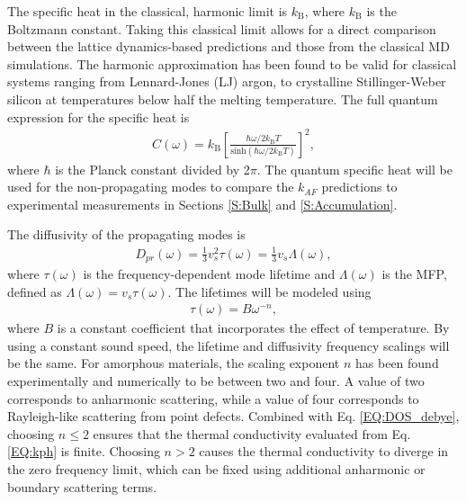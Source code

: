 \documentclass[aps,prb,twocolumn,superscriptaddress,footinbib,amsmath,amssymb,floatfix]{revtex4}
\begin{document}
The specific heat in the classical, harmonic limit is 
$k_{\text{B}}$, where $k_{\text{B}}$ is the Boltzmann constant. 
Taking this classical limit allows for a direct 
comparison between the lattice dynamics-based 
predictions and those from the classical MD simulations. 
The harmonic approximation has been found to be valid 
for classical systems ranging from 
Lennard-Jones (LJ) argon,\cite{mcgaughey_quantitative_2004} 
to crystalline Stillinger-Weber silicon\cite{larkin_comparison_2012} 
at temperatures below half the melting temperature. 
The full quantum expression for the specific heat is
\cite{ziman_electrons_2001}
\begin{equation}\label{EQ:Cquantum}
\begin{split}
C(\omega) = k_{\text{B}}\left[\frac{\hbar\omega/2k_{\text{B}}T}
{\text{sinh}(\hbar\omega/2k_{\text{B}}T)}\right]^2,
\end{split}
\end{equation} 
where $\hbar$ is the Planck constant divided by 2$\pi$. 
The quantum specific heat will be used 
for the non-propagating modes to compare the $k_{AF}$ predictions 
to experimental measurements in Sections \ref{S:Bulk} 
and \ref{S:Accumulation}. 

The diffusivity of the propagating modes is    
\begin{equation}\label{EQ:Dtau}
\begin{split}
D_{pr}(\omega) = \frac{1}{3}v^2_s\tau(\omega) = \frac{1}{3}v_s \Lambda(\omega),
\end{split}
\end{equation}
where $\tau(\omega)$ is the frequency-dependent mode 
lifetime and $\Lambda(\omega)$ is the MFP, 
defined as $\Lambda(\omega) = v_{s} \tau(\omega)$. 
The lifetimes will be modeled using 
\begin{equation}\label{EQ:tauw2}
\begin{split}
\tau(\omega) = B \omega^{-n},
\end{split}
\end{equation}
where $B$ is a constant coefficient that incorporates 
the effect of temperature. 
By using a constant sound speed, the lifetime and diffusivity 
frequency scalings will be the same. 
For amorphous materials, the scaling exponent $n$ 
has been found experimentally and numerically to be 
between two and four.
\cite{feldman_numerical_1999,horbach_high_2001,
feldman_calculations_2002,masciovecchio_evidence_2006,
christie_vibrational_2007,liu_high_2009,
baldi_sound_2010,yang_anomalously_2010,baldi_elastic_2011,
he_heat_2011,baldi_emergence_2013}
A value of two corresponds to 
anharmonic scattering,\cite{callaway_model_1959} while a value of four 
corresponds to Rayleigh-like scattering from point defects.
\cite{klemens_scattering_1955}
Combined with Eq. \eqref{EQ:DOS_debye}, choosing $n\le2$ ensures 
that the thermal conductivity evaluated from Eq. \eqref{EQ:kph} is finite. 
Choosing $n>2$ causes the thermal conductivity to diverge 
in the zero frequency limit,   
which can be fixed using additional anharmonic
\cite{feldman_thermal_1993,feldman_numerical_1999} 
or boundary scattering terms.
\cite{cahill_thermal_1994,liu_high_2009,yang_anomalously_2010}
\end{document}

